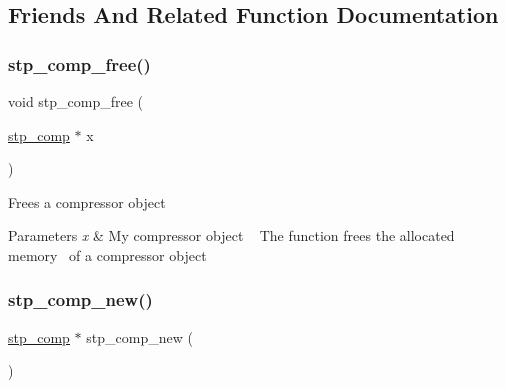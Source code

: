 \subsection{Friends And Related Function Documentation}
\mbox{\label{structstp__comp_a250b6965bb5bba02f74852c81d351e6b}} 
\subsubsection{\texorpdfstring{stp\+\_\+comp\+\_\+free()}{stp\_comp\_free()}}
{\footnotesize\ttfamily void stp\+\_\+comp\+\_\+free (\begin{DoxyParamCaption}\item[{\mbox{\hyperlink{structstp__comp}{stp\+\_\+comp}} $\ast$}]{x }\end{DoxyParamCaption})\hspace{0.3cm}{\ttfamily [related]}}



Frees a compressor object~\newline
 


\begin{DoxyParams}{Parameters}
{\em x} & My compressor object ~\newline
 The function frees the allocated memory~\newline
 of a compressor object \\
\hline
\end{DoxyParams}
\mbox{\label{structstp__comp_adcecb43a5505c7a62ff01747b89cba1c}} 
\subsubsection{\texorpdfstring{stp\+\_\+comp\+\_\+new()}{stp\_comp\_new()}}
{\footnotesize\ttfamily \mbox{\hyperlink{structstp__comp}{stp\+\_\+comp}} $\ast$ stp\+\_\+comp\+\_\+new (\begin{DoxyParamCaption}{ }\end{DoxyParamCaption})\hspace{0.3cm}{\ttfamily [related]}}



